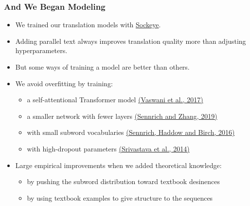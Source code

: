 \documentclass{beamer}
\begin{document}

\begin{frame}
  \frametitle{And We Began Modeling}
  \vspace{-1.0em}
  \begin{itemize}
  \item We trained our translation models with \href{https://awslabs.github.io/sockeye/}{Sockeye}.
  \vspace{0.25em}
  \item Adding parallel text always improves translation quality more than adjusting hyperparameters.
  \vspace{0.25em}
  \item But some ways of training a model are better than others.
  \vspace{0.25em}
  \item We avoid overfitting by training:
    \begin{itemize}
    \item a self-attentional Transformer model \href{https://arxiv.org/abs/1706.03762}{(Vaswani et al., 2017)}%
    \item a smaller network with fewer layers \href{https://arxiv.org/abs/1905.11901}{(Sennrich and Zhang, 2019)}
    \item with small subword vocabularies \href{https://arxiv.org/abs/1508.07909}{(Sennrich, Haddow and Birch, 2016)}
    \item with high-dropout parameters \href{http://jmlr.org/papers/v15/srivastava14a.html}{(Srivastava et al., 2014)}
    \end{itemize}
  \vspace{0.25em}
  \item Large empirical improvements when we added theoretical knowledge:
    \begin{itemize}
    \item by pushing the subword distribution toward textbook desinences
    \item by using textbook examples to give structure to the sequences
    \end{itemize}
  \end{itemize}
\end{frame}

\end{document}
